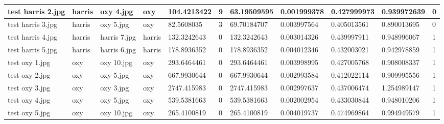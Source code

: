 \begin{landscape}
\begin{longtable}{|p{2cm}|p{1.5cm}|p{2cm}|p{1.5cm}|p{2cm}|p{1cm}|p{2cm}|p{2cm}|p{2cm}|p{2cm}|p{1cm}|}
		test harris 2.jpg    & harris           & oxy 4.jpg             & oxy                         & 104.4213422           & 9                       & 63.19509595                & 0.001999378           & 0.427999973           & 0.939972639              & 0                \\ \hline
		test harris 3.jpg    & harris           & oxy 5.jpg             & oxy                         & 82.5608035            & 3                       & 69.70184707                & 0.003997564           & 0.405013561           & 0.890013695              & 0                \\ \hline
		test harris 4.jpg    & harris           & harris 7.jpg          & harris                      & 132.3242643           & 0                       & 132.3242643                & 0.003014326           & 0.439997911           & 0.948996067              & 1                \\ \hline
		test harris 5.jpg    & harris           & harris 6.jpg          & harris                      & 178.8936352           & 0                       & 178.8936352                & 0.004012346           & 0.432003021           & 0.942978859              & 1                \\ \hline
		test oxy 1.jpg       & oxy              & oxy 10.jpg            & oxy                         & 293.6464461           & 0                       & 293.6464461                & 0.003998995           & 0.427005768           & 0.908008337              & 1                \\ \hline
		test oxy 2.jpg       & oxy              & oxy 5.jpg             & oxy                         & 667.9930644           & 0                       & 667.9930644                & 0.002993584           & 0.412022114           & 0.909995556              & 1                \\ \hline
		test oxy 3.jpg       & oxy              & oxy 3.jpg             & oxy                         & 2747.415983           & 0                       & 2747.415983                & 0.002997637           & 0.437006474           & 1.254989147              & 1                \\ \hline
		test oxy 4.jpg       & oxy              & oxy 5.jpg             & oxy                         & 539.5381663           & 0                       & 539.5381663                & 0.002002954           & 0.433030844           & 0.948010206              & 1                \\ \hline
		test oxy 5.jpg       & oxy              & oxy 10.jpg            & oxy                         & 265.4100819           & 0                       & 265.4100819                & 0.004019737           & 0.474969864           & 0.994949579              & 1                \\ \hline

\end{longtable}
\end{landscape}
